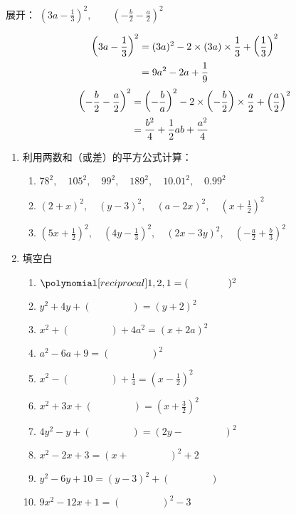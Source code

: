 \begin{example}
    展开：
    $\left(3a-\frac{1}{3}\right)^2,\qquad \left(-\frac{b}{2}-\frac{a}{2}\right)^2$
\end{example}


\begin{solution}
    \[\begin{split}
        \left(3a-\dfrac{1}{3}\right)^2&=(3a)^2-2\times(3a)\times\dfrac{1}{3}+\left(\dfrac{1}{3}\right)^2 \\
        &=  9a^2-2a+\dfrac{1}{9}
    \end{split}\]
    \[\begin{split}
        \left(-\dfrac{b}{2}-\dfrac{a}{2}\right)^2
        &=  \left(-\dfrac{b}{a}\right)^2-2\times\left(-\dfrac{b}{2}\right)\times\dfrac{a}{2}+\left(\dfrac{a}{2}\right)^2\\
        &=\dfrac{b^2}{4}+\dfrac{1}{2}ab+\dfrac{a^2}{4}
    \end{split}\]
\end{solution}

\begin{ex}
\begin{enumerate}
    \item 利用两数和（或差）的平方公式计算：
\begin{enumerate}
    \item $78^2,\quad 105^2,\quad 99^2,\quad 189^2,\quad 10.01^2,\quad 0.99^2$
    \item $(2+x)^2,\quad (y-3)^2,\quad (a-2x)^2,\quad \left(x+\frac{1}{2}\right)^2$ 
    \item $\left(5x+\frac{1}{2}\right)^2,\quad \left(4y-\frac{1}{3}\right)^2,\quad (2x-3y)^2,\quad \left(-\frac{a}{2}+\frac{b}{3}\right)^2$
\end{enumerate}
    
\item 填空白
\begin{enumerate}
    \item $\poly{1,2,1}=(\qquad\qquad)^2$
    \item $y^2+4y+(\qquad \qquad)=(y+2)^2$
    \item $x^2+(\qquad \qquad)+4a^2=(x+2a)^2$
    \item $a^2-6a+9=(\qquad \qquad)^2$
    \item $x^2-(\qquad \qquad)+\frac{1}{4}=\left(x-\frac{1}{2}\right)^2$
    \item $x^2+3x+(\qquad \qquad)=\left(x+\frac{3}{2}\right)^2$
    \item $4y^2-y+(\qquad \qquad)=(2y-\qquad \qquad)^2$
    \item $x^2-2x+3=(x+\qquad \qquad)^2+2$
    \item $y^2-6y+10=(y-3)^2+(\qquad \qquad)$
    \item $9x^2-12x+1=(\qquad \qquad)^2-3$
\end{enumerate}

\end{enumerate}    
\end{ex}

